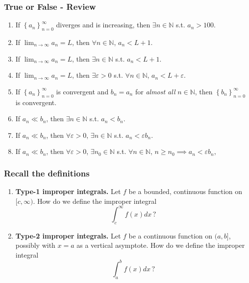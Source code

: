 \begin{frame}[t]
	\fontsize{13}{13}\selectfont
	\frametitle{True or False - Review}

	\begin{enumerate}
		\item If $\displaystyle \left\{ a_{n} \right\}_{n=0}^{\infty}$ diverges and is
			increasing, then $\exists n \in \mathbb{N}$ s.t. $a_{n}> 100$.
			\vfill

		\item If $\displaystyle \lim_{n \to \infty}a_{n}= L$, then
			$\forall n \in \mathbb{N}$, $\displaystyle a_{n}< L+1$.
			\vfill

		\item If $\displaystyle \lim_{n \to \infty}a_{n}= L$, then
			$\exists n \in \mathbb{N}$ s.t. $\displaystyle a_{n}< L+1$.
			\vfill

		\item If $\displaystyle \lim_{n \to \infty}a_{n}= L$, then
			$\exists \varepsilon>0$ s.t. $\forall n \in \mathbb{N}$,
			$\displaystyle a_{n}< L+\varepsilon$.
			\vfill

		\item If $\left\{ a_{n} \right\}_{n=0}^{\infty}$ is convergent and $b_{n}=a_{n}$
			for \emph{almost all} $n \in \mathbb{N}$, then $\left\{ b_{n} \right\}_{n=0}
			^{\infty}$ is convergent.
			\vfill

		\item If $a_{n}\ll b_{n}$, then $\exists n \in \mathbb{N}$ s.t. $a_{n}< b_{n}$.
			\vfill

		\item If $a_{n}\ll b_{n}$, then $\forall \varepsilon >0$, $\exists n \in \mathbb{N}$
			s.t. $a_{n}< \varepsilon b_{n}$.
			\vfill

		\item If $a_{n}\ll b_{n}$, then $\forall \varepsilon >0$, $\exists n_{0}\in \mathbb{N}$
			s.t. $\forall n \in \mathbb{N}$, $n \geq n_{0}\implies a_{n}< \varepsilon b
			_{n}$,
			\vfill
	\end{enumerate}
\end{frame}

\begin{frame}[t]
	\frametitle{Recall the definitions}

	\begin{enumerate}
		\item {\bfseries Type-1 improper integrals.} Let $f$ be a bounded,
			continuous function on $\displaystyle [c, \infty)$. How do we define the improper
			integral
			\[
				\int_{c}^{\infty}f(x) dx \, ?
			\]

			\vfill

		\item {\bfseries Type-2 improper integrals.} Let $f$ be a continuous function
			on $\displaystyle (a,b]$, possibly with $x=a$ as a vertical asymptote. How
			do we define the improper integral
			\[
				\int_{a}^{b}f(x) dx \, ?
			\]

			\vfill
	\end{enumerate}
\end{frame}

